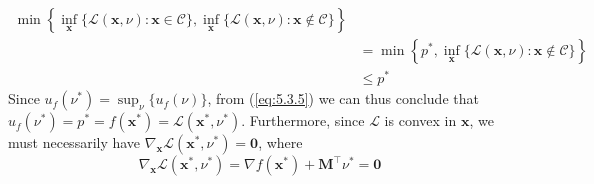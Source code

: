 \documentclass{article}
\numberwithin{equation}{section}
\begin{document}
\begin{enumerate}[label=\alph*.]
\begin{equation}
\begin{split}
            \min\left\{
                \inf_\mathbf{x}\{\mathcal{L}(\mathbf{x}, \nu) :
                \mathbf{x} \in \mathcal{C}\},
                \inf_\mathbf{x}\{\mathcal{L}(\mathbf{x}, \nu) :
                \mathbf{x} \notin \mathcal{C}\}
            \right\}
            \\
            & =
            \min\left\{
                p^*,
                \inf_\mathbf{x}\{\mathcal{L}(\mathbf{x}, \nu) :
                \mathbf{x} \notin \mathcal{C}\}
            \right\}
            \\
            & \le p^*
        \end{split}
    \end{equation}
    Since $ u_f(\nu^*) = \sup_\nu\{u_f(\nu)\} $, from (\ref{eq:5.3.5}) we can
    thus conclude that $ u_f(\nu^*) = p^* = f(\mathbf{x}^*) =
    \mathcal{L}(\mathbf{x}^*, \nu^*) $. Furthermore, since $ \mathcal{L} $ is
    convex in $ \mathbf{x} $, we must necessarily have
    $ \nabla_\mathbf{x}\mathcal{L}(\mathbf{x}^*, \nu^*) = \mathbf{0} $, where
    \begin{equation} \label{eq:5.3.6}
        \nabla_\mathbf{x}\mathcal{L}(\mathbf{x}^*, \nu^*) = \nabla
        f(\mathbf{x}^*) + \mathbf{M}^\top\nu^* = \mathbf{0}
    \end{equation}
\end{enumerate}



\end{document}

